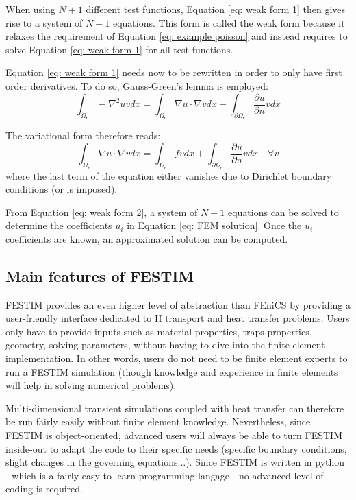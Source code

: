 When using $N+1$ different test functions, Equation \ref{eq: weak form 1} then gives rise to a system of $N+1$ equations.
This form is called the weak form because it relaxes the requirement of Equation \ref{eq: example poisson} and instead requires to solve Equation \ref{eq: weak form 1} for all test functions.

Equation \ref{eq: weak form 1} needs now to be rewritten in order to only have first order derivatives.
To do so, Gauss-Green's lemma is employed:
\begin{equation}
    \int_{\Omega_e} -\nabla^2 u v dx = \int_{\Omega_e} \nabla u \cdot \nabla v dx - \int_{\partial \Omega_e} \frac{\partial u}{\partial n} v dx
    \label{eq: gauss-green}
\end{equation}

The variational form therefore reads:
\begin{equation}
    \int_{\Omega_e} \nabla u \cdot \nabla v dx = \int_{\Omega_e} f v dx + \int_{\partial \Omega_e} \frac{\partial u}{\partial n} v dx \quad \forall v
    \label{eq: weak form 2}
\end{equation}
where the last term of the equation either vanishes due to Dirichlet boundary conditions (or is imposed).

From Equation \ref{eq: weak form 2}, a system of $N+1$ equations can be solved to determine the coefficients $u_i$ in Equation \ref{eq: FEM solution}.
Once the $u_i$ coefficients are known, an approximated solution can be computed.

\subsection{Main features of FESTIM}
FESTIM provides an even higher level of abstraction than FEniCS by providing a user-friendly interface dedicated to H transport and heat transfer problems.
Users only have to provide inputs such as material properties, traps properties, geometry, solving parameters, without having to dive into the finite element implementation.
In other words, users do not need to be finite element experts to run a FESTIM simulation (though knowledge and experience in finite elements will help in solving numerical problems).

Multi-dimensional transient simulations coupled with heat transfer can therefore be run fairly easily without finite element knowledge.
Nevertheless, since FESTIM is object-oriented, advanced users will always be able to turn FESTIM inside-out to adapt the code to their specific needs (specific boundary conditions, slight changes in the governing equations...).
Since FESTIM is written in python - which is a fairly easy-to-learn programming langage - no advanced level of coding is required.

